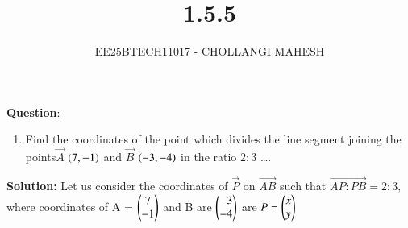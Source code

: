 \documentclass[journal]{IEEEtran}
\begin{document}

\vspace{3cm}

\title{1.5.5}
\author{EE25BTECH11017 - CHOLLANGI MAHESH}
{\let\newpage\relax\maketitle}

\renewcommand{\thefigure}{\theenumi}
\renewcommand{\thetable}{\theenumi}
\setlength{\intextsep}{10pt} %


\renewcommand{\thetable}{\theenumi}


\textbf{Question}:\\
\begin{enumerate}
\item Find the coordinates of the point which divides the line segment joining the points$\vec{A}$ $\left(7,-1\right)$ and $\vec{B}$ $\left(-3, -4\right)$ in the ratio $2 : 3$ \dots.
\end{enumerate}

\quad

\textbf{Solution:}
Let us consider the coordinates of $\vec{P}$  on $\vec{AB}$ such that $\vec{AP:PB}=2:3 ,$ where coordinates of A = $\begin{pmatrix}7\\-1\end{pmatrix}$ and B are $\begin{pmatrix}-3\\-4\end{pmatrix}$ are 
$P=\begin{pmatrix}x\\y\end{pmatrix}$
\end{document}
